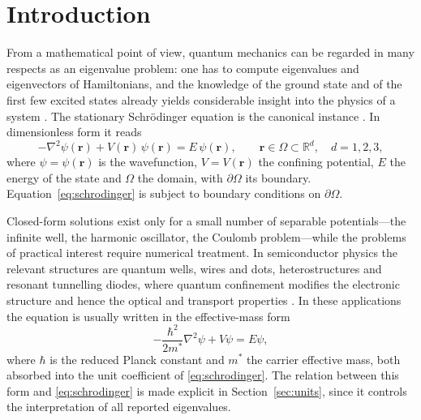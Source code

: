 \documentclass[pdflatex,sn-mathphys-num]{sn-jnl}
\theoremstyle{thmstyleone}%
\theoremstyle{thmstyletwo}%
\theoremstyle{thmstylethree}%
\begin{document}


\maketitle

\section{Introduction}\label{sec:intro}

From a mathematical point of view, quantum mechanics can be regarded in many
respects as an eigenvalue problem: one has to compute eigenvalues and
eigenvectors of Hamiltonians, and the knowledge of the ground state and of the
first few excited states already yields considerable insight into the physics of
a system \cite{malvezzi2003}. The stationary Schr\"odinger equation is the
canonical instance \cite{courant1953,datta2005}. In dimensionless form it
reads
%
\begin{equation}\label{eq:schrodinger}
  -\nabla^2 \psi(\mathbf{r}) + V(\mathbf{r})\,\psi(\mathbf{r})
  = E\,\psi(\mathbf{r}),
  \qquad \mathbf{r} \in \Omega \subset \mathbb{R}^d,
  \quad d = 1, 2, 3,
\end{equation}
%
where $\psi = \psi(\mathbf{r})$ is the wavefunction, $V = V(\mathbf{r})$ the
confining potential, $E$ the energy of the state and $\Omega$ the domain, with
$\partial\Omega$ its boundary. Equation~\eqref{eq:schrodinger} is subject to
boundary conditions on $\partial\Omega$.

Closed-form solutions exist only for a small number of separable
potentials---the infinite well, the harmonic oscillator, the Coulomb
problem---while the problems of practical interest require numerical treatment.
In semiconductor physics the relevant structures are quantum wells, wires and
dots, heterostructures and resonant tunnelling diodes, where quantum
confinement modifies the electronic structure and hence the optical and
transport properties \cite{harrison2005,caruso2019}. In these
applications the equation is usually written in the effective-mass form
%
\begin{equation}\label{eq:effectivemass}
  -\frac{\hbar^2}{2m^*}\nabla^2\psi + V\psi = E\psi ,
\end{equation}
%
where $\hbar$ is the reduced Planck constant and $m^*$ the carrier effective
mass, both absorbed into the unit coefficient of \eqref{eq:schrodinger}. The
relation between this form and \eqref{eq:schrodinger} is made explicit in
Section~\ref{sec:units}, since it controls the interpretation of all reported
eigenvalues.
\end{document}
